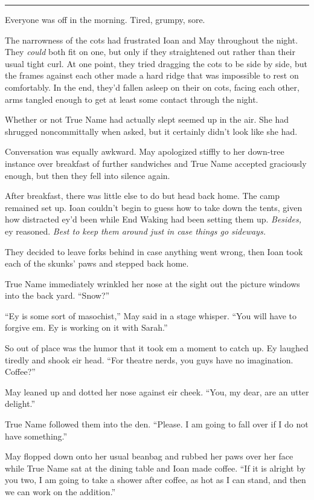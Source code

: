 \begin{center}\rule{0.5\linewidth}{0.5pt}\end{center}

Everyone was off in the morning. Tired, grumpy, sore.

The narrowness of the cots had frustrated Ioan and May throughout the night. They \emph{could} both fit on one, but only if they straightened out rather than their usual tight curl. At one point, they tried dragging the cots to be side by side, but the frames against each other made a hard ridge that was impossible to rest on comfortably. In the end, they'd fallen asleep on their on cots, facing each other, arms tangled enough to get at least some contact through the night.

Whether or not True Name had actually slept seemed up in the air. She had shrugged noncommittally when asked, but it certainly didn't look like she had.

Conversation was equally awkward. May apologized stiffly to her down-tree instance over breakfast of further sandwiches and True Name accepted graciously enough, but then they fell into silence again.

After breakfast, there was little else to do but head back home. The camp remained set up. Ioan couldn't begin to guess how to take down the tents, given how distracted ey'd been while End Waking had been setting them up. \emph{Besides,} ey reasoned. \emph{Best to keep them around just in case things go sideways.}

They decided to leave forks behind in case anything went wrong, then Ioan took each of the skunks' paws and stepped back home.

True Name immediately wrinkled her nose at the sight out the picture windows into the back yard. ``Snow?''

``Ey is some sort of masochist,'' May said in a stage whisper. ``You will have to forgive em. Ey is working on it with Sarah.''

So out of place was the humor that it took em a moment to catch up. Ey laughed tiredly and shook eir head. ``For theatre nerds, you guys have no imagination. Coffee?''

May leaned up and dotted her nose against eir cheek. ``You, my dear, are an utter delight.''

True Name followed them into the den. ``Please. I am going to fall over if I do not have something.''

May flopped down onto her usual beanbag and rubbed her paws over her face while True Name sat at the dining table and Ioan made coffee. ``If it is alright by you two, I am going to take a shower after coffee, as hot as I can stand, and then we can work on the addition.''

